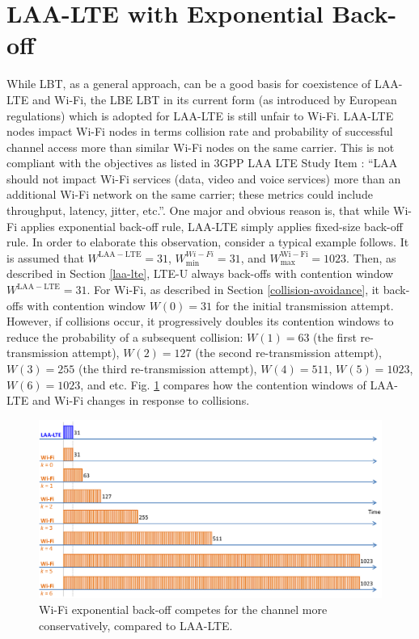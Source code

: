 \section{LAA-LTE with Exponential Back-off}
\label{subsection:exp-back-off}

While LBT, as a general approach, can be a good basis for coexistence of LAA-LTE and Wi-Fi, the LBE LBT in its current form (as introduced by European regulations) which is adopted for LAA-LTE is still unfair to Wi-Fi. LAA-LTE nodes impact Wi-Fi nodes in terms collision rate and probability of successful channel access more than similar Wi-Fi nodes on the same carrier. This is not compliant with the objectives as listed in 3GPP LAA LTE Study Item \cite{LAA-LTE-SI}: ``LAA should not impact Wi-Fi services (data, video and voice services) more than an additional Wi-Fi network on the same carrier; these metrics could include throughput, latency, jitter, etc.''. One major and obvious reason is, that while Wi-Fi applies exponential back-off rule, LAA-LTE simply applies fixed-size back-off rule. In order to elaborate this observation, consider a typical example follows. It is assumed that $W^{\mathrm{LAA-LTE}}=31$, $W^{Wi-Fi}_{\min}=31$, and $W^{\mathrm{Wi-Fi}}_{\max}=1023$. Then, as described in Section \ref{laa-lte}, LTE-U always back-offs with contention window $W^{\mathrm{LAA-LTE}}=31$. For Wi-Fi, as described in Section \ref{collision-avoidance}, it back-offs with contention window $W(0)=31$ for the initial transmission attempt. However, if collisions occur, it progressively doubles its contention windows to reduce the probability of a subsequent collision: $W(1)=63$ (the first re-transmission attempt), $W(2)=127$ (the second re-transmission attempt), $W(3)=255$ (the third re-transmission attempt), $W(4)=511$, $W(5)=1023$, $W(6)=1023$, and etc. Fig. \ref{figs:LAA-LTE-enhacement-back-off} compares how the contention windows of LAA-LTE and Wi-Fi changes in response to collisions.
\begin{figure}[!ht]
	\centering
	\includegraphics[width=1.0\columnwidth]{figs/LAA-LTE-enhacement-back-off}
	\caption{Wi-Fi exponential back-off competes for the channel more conservatively, compared to LAA-LTE.}
	\label{figs:LAA-LTE-enhacement-back-off}
\end{figure}

